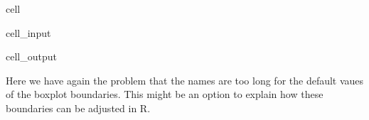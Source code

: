 \documentclass[letterpaper,10pt,english]{jupyterBook}
\begin{document}
\begin{sphinxuseclass}{cell}\begin{sphinxVerbatimInput}

\begin{sphinxuseclass}{cell_input}
\begin{sphinxVerbatim}[commandchars=\\\{\}]
\end{sphinxVerbatim}

\end{sphinxuseclass}\end{sphinxVerbatimInput}
\begin{sphinxVerbatimOutput}

\begin{sphinxuseclass}{cell_output}
\noindent{}

\end{sphinxuseclass}\end{sphinxVerbatimOutput}

\end{sphinxuseclass}
\sphinxAtStartPar
Here we have again the problem that the names are too long for the default vaues of the boxplot boundaries. This might be an option to explain how these boundaries can be adjusted in R.
\end{document}
